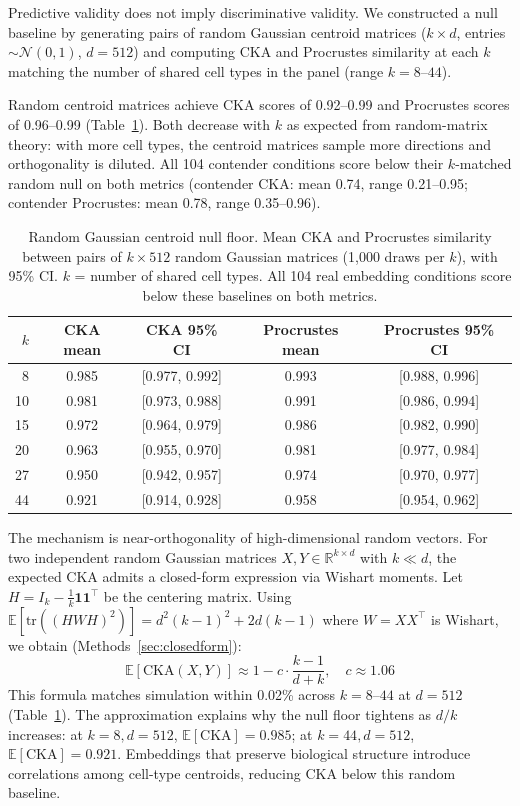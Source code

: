 \documentclass[11pt]{article}
\newcommand{\R}{\mathbb{R}}
\begin{document}
Predictive validity does not imply discriminative validity. We
constructed a null baseline by generating pairs of random Gaussian
centroid matrices ($k \times d$, entries $\sim \mathcal{N}(0,1)$, $d
= 512$) and computing CKA and Procrustes similarity at each $k$
matching the number of shared cell types in the panel (range $k =
8$--$44$).

Random centroid matrices achieve CKA scores of 0.92--0.99 and
Procrustes scores of 0.96--0.99 (Table~\ref{tab:nullfloor}). Both
decrease with $k$ as expected from random-matrix theory: with more cell
types, the centroid matrices sample more directions and orthogonality is
diluted. All 104 contender conditions score below their $k$-matched
random null on both metrics (contender CKA: mean 0.74, range
0.21--0.95; contender Procrustes: mean 0.78, range 0.35--0.96).

\begin{table}[t]
\centering
\caption{Random Gaussian centroid null floor. Mean CKA and Procrustes
similarity between pairs of $k \times 512$ random Gaussian matrices
(1,000 draws per $k$), with 95\% CI. $k$ = number of shared cell
types. All 104 real embedding conditions score below these baselines
on both metrics.}
\label{tab:nullfloor}
\small
\begin{tabular}{@{}rcccc@{}}
\toprule
$k$ & CKA mean & CKA 95\% CI & Procrustes mean & Procrustes 95\% CI \\
\midrule
8  & 0.985 & [0.977, 0.992] & 0.993 & [0.988, 0.996] \\
10 & 0.981 & [0.973, 0.988] & 0.991 & [0.986, 0.994] \\
15 & 0.972 & [0.964, 0.979] & 0.986 & [0.982, 0.990] \\
20 & 0.963 & [0.955, 0.970] & 0.981 & [0.977, 0.984] \\
27 & 0.950 & [0.942, 0.957] & 0.974 & [0.970, 0.977] \\
44 & 0.921 & [0.914, 0.928] & 0.958 & [0.954, 0.962] \\
\bottomrule
\end{tabular}
\end{table}

The mechanism is near-orthogonality of high-dimensional random vectors.
For two independent random Gaussian matrices $X, Y \in \R^{k \times d}$
with $k \ll d$, the expected CKA admits a closed-form expression via
Wishart moments. Let $H = I_k - \frac{1}{k}\mathbf{1}\mathbf{1}^\top$
be the centering matrix. Using
$\mathbb{E}[\mathrm{tr}((HW H)^2)] = d^2(k{-}1)^2 + 2d(k{-}1)$ where
$W = XX^\top$ is Wishart, we obtain (Methods~\ref{sec:closedform}):
\begin{equation}
\label{eq:cka_null}
\mathbb{E}[\mathrm{CKA}(X, Y)] \approx 1 - c \cdot \frac{k-1}{d+k},
\quad c \approx 1.06
\end{equation}
This formula matches simulation within 0.02\% across $k = 8$--$44$ at
$d = 512$ (Table~\ref{tab:nullfloor}). The approximation explains why
the null floor tightens as $d/k$ increases: at $k = 8, d = 512$,
$\mathbb{E}[\mathrm{CKA}] = 0.985$; at $k = 44, d = 512$,
$\mathbb{E}[\mathrm{CKA}] = 0.921$. Embeddings that preserve biological
structure introduce correlations among cell-type centroids, reducing CKA
below this random baseline.
\end{document}
